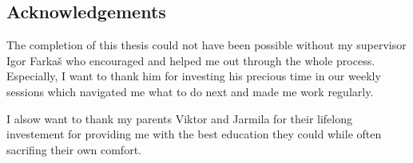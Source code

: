 
\null 
\vfill 

\subsection*{Acknowledgements}

The completion of this thesis could not have been possible without my supervisor Igor Farkaš who encouraged and helped me out through the whole process. Especially, I want to thank him for investing his precious time in our weekly sessions which navigated me what to do next and made me work regularly. 

I alsow want to thank my parents Viktor and Jarmila for their lifelong investement for providing me with the best education they could while often sacrifing their own comfort. 
